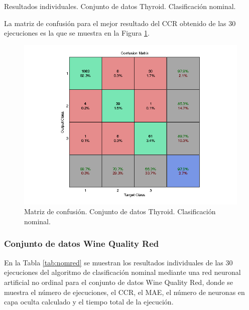 			\begin{table}[!htbp]
				\centering
				\caption{Resultados individuales. Conjunto de datos Thyroid. Clasificación nominal.}
				\label{tab:nomthy}
			\end{table}
			
			La matriz de confusión para el mejor resultado del CCR obtenido de las 30 ejecuciones es la que se muestra en la Figura \ref{fig:nomthy}.
			
			\begin{figure}[htbp]
				\centering
				\includegraphics[scale=0.8]{../src/results/nominal/thyroid_mc29.png}
				\caption{Matriz de confusión. Conjunto de datos Thyroid. Clasificación nominal.}
				\label{fig:nomthy}
			\end{figure}

			\subsubsection{Conjunto de datos Wine Quality Red}
			
			En la Tabla \ref{tab:nomred} se muestran los resultados individuales de las 30 ejecuciones del algoritmo de clasificación nominal mediante una red neuronal artificial no ordinal para el conjunto de datos Wine Quality Red, donde se muestra el número de ejecuciones, el CCR, el MAE, el número de neuronas en capa oculta calculado y el tiempo total de la ejecución.\\
			
